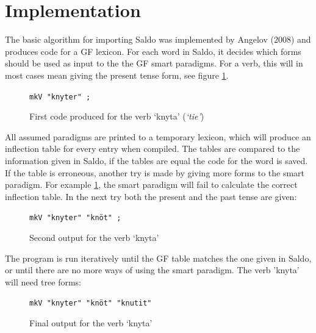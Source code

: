 \documentclass{report}
\begin{document}
\section{Implementation}
The basic algorithm for importing Saldo was implemented by Angelov (2008)
and  produces code for a GF lexicon.
For each word in Saldo, it decides which forms should be used as input
to the the GF smart paradigms. For a verb, this will in most cases mean giving
the present tense form, see figure \ref{fig:saldoknyt}. \\

\begin{figure}[h]
\verb-mkV "knyter" ;-
\caption{First code produced for the verb `knyta' (\emph{`tie'})}
\label{fig:saldoknyt}
\end{figure}

All assumed paradigms are printed to a temporary lexicon, 
which will produce an inflection table for every entry when compiled.
The tables are compared to the information given
in Saldo, if the tables are equal the code for the word is saved. If the table
is erroneous, another try is made
by giving more forms to the smart paradigm.
For example \ref{fig:saldoknyt}, the smart paradigm will fail to calculate the
correct inflection table. In the next try both the present and the past tense
are given:\\

\begin{figure}[h]
\verb-mkV "knyter" "knöt" ;-
\caption{Second output for the verb `knyta'}
\label{fig:saldoknyt2}
\end{figure}
The program is run iteratively until the GF table matches the one given in Saldo,
or until there are no more ways of using the smart paradigm. The verb 'knyta'
will need tree forms:\\

\begin{figure}[h]
\verb-mkV "knyter" "knöt" "knutit"-\\
\caption{Final output for the verb `knyta'}
\label{fig:saldoknyt3}
\end{figure}

\end{document}
